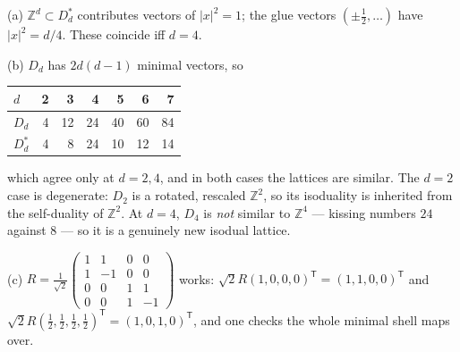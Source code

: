 {(a) $\mathbb{Z}^d\subset D_d^{*}$ contributes vectors of $|x|^2=1$; the glue
vectors $(\pm\tfrac12,\dots)$ have $|x|^2=d/4$. These coincide iff $d=4$.

(b) $D_d$ has $2d(d-1)$ minimal vectors, so
\begin{center}
\begin{tabular}{lrrrrrr}
 $d$ & 2 & 3 & 4 & 5 & 6 & 7\\ \hline
 $D_d$ & 4 & 12 & 24 & 40 & 60 & 84\\
 $D_d^{*}$ & 4 & 8 & 24 & 10 & 12 & 14
\end{tabular}
\end{center}
which agree only at $d=2,4$, and in both cases the lattices are similar. The
$d=2$ case is degenerate: $D_2$ is a rotated, rescaled $\mathbb{Z}^2$, so its
isoduality is inherited from the self-duality of $\mathbb{Z}^2$. At $d=4$,
$D_4$ is \emph{not} similar to $\mathbb{Z}^4$ --- kissing numbers $24$ against
$8$ --- so it is a genuinely new isodual lattice.

(c) $R=\tfrac{1}{\sqrt2}\left(\begin{smallmatrix}1&1&0&0\\1&-1&0&0\\
0&0&1&1\\0&0&1&-1\end{smallmatrix}\right)$ works:
$\sqrt2 R(1,0,0,0)^{\mathsf T}=(1,1,0,0)^{\mathsf T}$ and
$\sqrt2 R(\tfrac12,\tfrac12,\tfrac12,\tfrac12)^{\mathsf T}=(1,0,1,0)^{\mathsf T}$,
and one checks the whole minimal shell maps over.}

